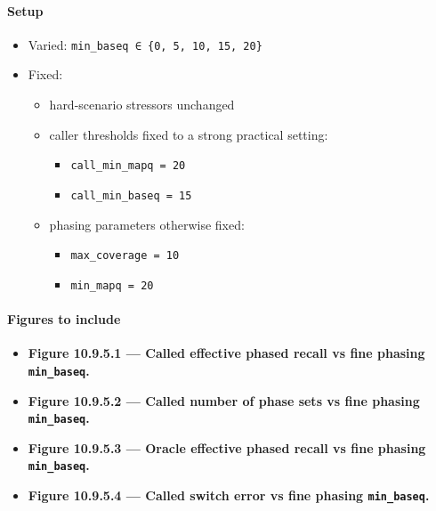 \documentclass[
]{article}
\providecommand{\tightlist}{%
  \setlength{\itemsep}{0pt}\setlength{\parskip}{0pt}}
\begin{document}
\paragraph{Setup}\label{setup-11}

\begin{itemize}
\tightlist
\item
  Varied: \texttt{min\_baseq\ ∈\ \{0,\ 5,\ 10,\ 15,\ 20\}}
\item
  Fixed:

  \begin{itemize}
  \tightlist
  \item
    hard-scenario stressors unchanged
  \item
    caller thresholds fixed to a strong practical setting:

    \begin{itemize}
    \tightlist
    \item
      \texttt{call\_min\_mapq\ =\ 20}
    \item
      \texttt{call\_min\_baseq\ =\ 15}
    \end{itemize}
  \item
    phasing parameters otherwise fixed:

    \begin{itemize}
    \tightlist
    \item
      \texttt{max\_coverage\ =\ 10}
    \item
      \texttt{min\_mapq\ =\ 20}
    \end{itemize}
  \end{itemize}
\end{itemize}

\paragraph{Figures to include}\label{figures-to-include-11}

\begin{itemize}
\tightlist
\item
  \textbf{Figure 10.9.5.1 --- Called effective phased recall vs fine
  phasing \texttt{min\_baseq}.}
\item
  \textbf{Figure 10.9.5.2 --- Called number of phase sets vs fine
  phasing \texttt{min\_baseq}.}
\item
  \textbf{Figure 10.9.5.3 --- Oracle effective phased recall vs fine
  phasing \texttt{min\_baseq}.}
\item
  \textbf{Figure 10.9.5.4 --- Called switch error vs fine phasing
  \texttt{min\_baseq}.}
\end{itemize}
\end{document}
